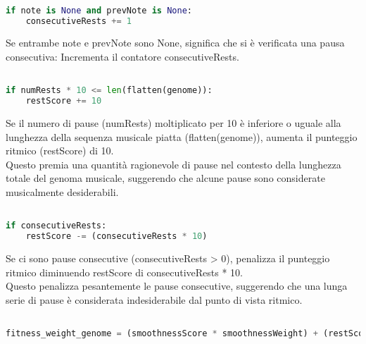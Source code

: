 \documentclass[a4paper,12pt]{report}
\begin{document}
\begin{lstlisting}[language=Python]

if note is None and prevNote is None:
    consecutiveRests += 1

\end{lstlisting}

Se entrambe note e prevNote sono None, significa che si è verificata una pausa consecutiva: Incrementa il contatore consecutiveRests.

\begin{lstlisting}[language=Python]

if numRests * 10 <= len(flatten(genome)):
    restScore += 10

\end{lstlisting}

Se il numero di pause (numRests) moltiplicato per 10 è inferiore o uguale alla lunghezza della sequenza musicale piatta (flatten(genome)), aumenta il punteggio ritmico (restScore) di 10. \\
Questo premia una quantità ragionevole di pause nel contesto della lunghezza totale del genoma musicale, suggerendo che alcune pause sono considerate musicalmente desiderabili.

\begin{lstlisting}[language=Python]

if consecutiveRests:
    restScore -= (consecutiveRests * 10)

\end{lstlisting}

Se ci sono pause consecutive (consecutiveRests > 0), penalizza il punteggio ritmico diminuendo restScore di consecutiveRests * 10. \\
Questo penalizza pesantemente le pause consecutive, suggerendo che una lunga serie di pause è considerata indesiderabile dal punto di vista ritmico.

\begin{lstlisting}[language=Python]

fitness_weight_genome = (smoothnessScore * smoothnessWeight) + (restScore * restWeight) + (harmonyScore * harmonyWeight)

\end{lstlisting}
\end{document}
